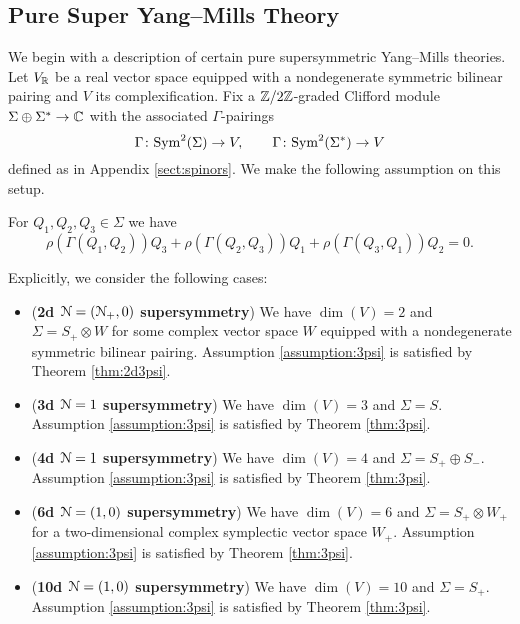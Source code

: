 \documentclass[10pt, oneside]{article}
\begin{document}
\subsection{Pure Super Yang--Mills Theory}
\label{sect:gaugemultipletSUSY}

We begin with a description of certain pure supersymmetric Yang--Mills theories. Let $V_\mathbb R$ be a real vector space equipped with a nondegenerate symmetric bilinear pairing and $V$ its complexification. Fix a $\mathbb Z/2\mathbb Z$-graded Clifford module $\Sigma\oplus \Sigma^*\rightarrow \mathbb C$ with the associated $\Gamma$-pairings
\[\Gamma\colon {\rm Sym}^2(\Sigma)\rightarrow V,\qquad \Gamma\colon {\rm Sym}^2(\Sigma^*)\rightarrow V\]
defined as in Appendix \ref{sect:spinors}. We make the following assumption on this setup.

\begin{assumption}
For $Q_1, Q_2, Q_3\in\Sigma$ we have
\[\rho(\Gamma(Q_1, Q_2))Q_3 + \rho(\Gamma(Q_2, Q_3))Q_1 + \rho(\Gamma(Q_3, Q_1))Q_2 = 0.\]
\label{assumption:3psi}
\end{assumption}

Explicitly, we consider the following cases:
\begin{itemize}
\item (\textbf{2d $\mathcal N=(\mathcal N_+, 0)$ supersymmetry}) We have $\dim(V) = 2$ and $\Sigma = S_+\otimes W$ for some complex vector space $W$ equipped with a nondegenerate symmetric bilinear pairing. Assumption \ref{assumption:3psi} is satisfied by Theorem \ref{thm:2d3psi}.

\item (\textbf{3d $\mathcal N=1$ supersymmetry}) We have $\dim(V) = 3$ and $\Sigma = S$. Assumption \ref{assumption:3psi} is satisfied by Theorem \ref{thm:3psi}.

\item (\textbf{4d $\mathcal N=1$ supersymmetry}) We have $\dim(V) = 4$ and $\Sigma = S_+\oplus S_-$. Assumption \ref{assumption:3psi} is satisfied by Theorem \ref{thm:3psi}.

\item (\textbf{6d $\mathcal N=(1, 0)$ supersymmetry}) We have $\dim(V) = 6$ and $\Sigma = S_+\otimes W_+$ for a two-dimensional complex symplectic vector space $W_+$. Assumption \ref{assumption:3psi} is satisfied by Theorem \ref{thm:3psi}.

\item (\textbf{10d $\mathcal N=(1, 0)$ supersymmetry}) We have $\dim(V) = 10$ and $\Sigma = S_+$. Assumption \ref{assumption:3psi} is satisfied by Theorem \ref{thm:3psi}.
\end{itemize}
\end{document}
